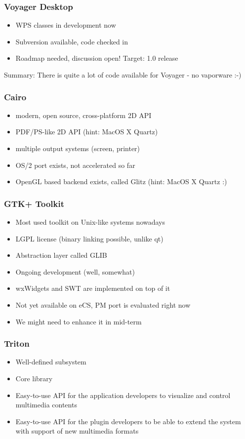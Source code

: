 \documentclass{beamer}
\begin{document}
\begin{frame}
\frametitle{Voyager Desktop}
\begin{itemize}[<+->]
  \item WPS classes in development now
  \item Subversion available, code checked in
  \item Roadmap needed, discussion open! Target: 1.0 release
\end{itemize}
Summary: There is quite a lot of code available for Voyager - no vaporware :-)
\end{frame}

\begin{frame}
\frametitle{Cairo}
\begin{itemize}[<+->]
  \item modern, open source, cross-platform 2D API
  \item PDF/PS-like 2D API (hint: MacOS X Quartz)
  \item multiple output systems (screen, printer)
  \item OS/2 port exists, not accelerated so far
  \item OpenGL based backend exists, called Glitz (hint: MacOS X Quartz :)
\end{itemize}
\end{frame}

\begin{frame}
\frametitle{GTK+ Toolkit}
\begin{itemize}[<+->]
  \item Most used toolkit on Unix-like systems nowadays
  \item LGPL license (binary linking possible, unlike qt)
  \item Abstraction layer called GLIB
  \item Ongoing development (well, somewhat)
  \item wxWidgets and SWT are implemented on top of it
  \item Not yet available on eCS, PM port is evaluated right now
  \item We might need to enhance it in mid-term
\end{itemize}
\end{frame}

\begin{frame}
\frametitle{Triton}
\begin{itemize}[<+->]
	\item Well-defined subsystem
	\item Core library
	\item Easy-to-use API for the application developers to visualize and control multimedia contents
	\item Easy-to-use API for the plugin developers to be able to extend the system with support of new multimedia formats
\end{itemize}
\end{frame}
\end{document}
